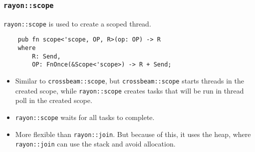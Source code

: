 \documentclass[aspectratio=1610,t]{beamer}
\begin{document}
\begin{frame}[fragile]
\frametitle{\texttt{rayon::scope}}
\texttt{rayon::scope} is used to create a scoped thread.

\begin{verbatim}
    pub fn scope<'scope, OP, R>(op: OP) -> R
    where
        R: Send,
        OP: FnOnce(&Scope<'scope>) -> R + Send;
\end{verbatim}

\begin{itemize}
    \item<2-> Similar to \texttt{crossbeam::scope}, but \texttt{crossbeam::scope} starts threads in the created scope, while \texttt{rayon::scope} creates tasks that will be run in thread poll in the created scope.
    \item<3-> \texttt{rayon::scope} waits for all tasks to complete.
    \item<4-> More flexible than \texttt{rayon::join}. But because of this, it uses the heap, where \texttt{rayon::join} can use the stack and avoid allocation.
\end{itemize}
\end{frame}

\end{document}
